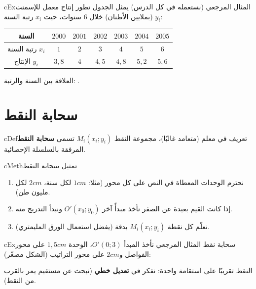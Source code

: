 \documentclass[12pt,a4paper]{article}
\newenvironment{BOX}[2]{\begin{otherlanguage}{english}\begin{arbox}{#1}{#2}}{\end{arbox}\end{otherlanguage}}
\newenvironment{tarif}[1][تعريف]{\begin{BOX}{cDef}{#1}}{\end{BOX}}
\newenvironment{mithal}[1][مثال]{\begin{BOX}{cEx}{#1}}{\end{BOX}}
\newenvironment{tariqa}[1][طريقة]{\begin{BOX}{cMeth}{#1}}{\end{BOX}}
\newenvironment{LTR}{\begin{otherlanguage}{english}}{\end{otherlanguage}}
\newcommand{\ar}[1]{\foreignlanguage{arabic}{#1}}
\newcommand{\bxt}[1]{\foreignlanguage{english}{\bxtbox{\ar{#1}}}}
\newcommand{\Paper}[2]{%
 \fill[orange!4] (0cm,0cm) rectangle (#1,#2);
 \draw[orange!22,very thin,step=1mm] (0cm,0cm) grid (#1,#2);
 \draw[orange!40,thin,step=5mm] (0cm,0cm) grid (#1,#2);
 \draw[orange!65,step=1cm] (0cm,0cm) grid (#1,#2);}
\newcommand{\Pt}[1]{\fill[cThm] #1 circle (2.2pt);}
\newenvironment{FIG}{\par\begin{center}\begin{LTR}}{\end{LTR}\end{center}}
\begin{document}
\begin{mithal}[المثال المرجعي (نستعمله في كل الدرس)]
يمثل الجدول تطور إنتاج معمل للإسمنت $y_i$ (بملايين الأطنان) خلال 6 سنوات، حيث $x_i$ رتبة السنة:
\begin{center}
\begin{tabular}{|C|c|c|c|c|c|c|}\hline
{} السنة & $2000$ & $2001$ & $2002$ & $2003$ & $2004$ & $2005$\\\hline
رتبة السنة $x_i$ & $1$ & $2$ & $3$ & $4$ & $5$ & $6$\\\hline
الإنتاج $y_i$ & $3,8$ & $4$ & $4,5$ & $4,8$ & $5,2$ & $5,6$\\\hline
\end{tabular}
\end{center}
العلاقة بين السنة والرتبة: \bxt{السنة $=1999+x_i$}.
\end{mithal}

\section{سحابة النقط}
\begin{tarif}
في معلم (متعامد غالبًا)، مجموعة النقط $M_i(x_i;y_i)$ تسمى \textbf{سحابة النقط} المرفقة بالسلسلة الإحصائية.
\end{tarif}

\begin{tariqa}[تمثيل سحابة النقط]
\begin{enumerate}[label=\textbf{\arabic*.}]
\item نحترم الوحدات المعطاة في النص على كل محور (مثلا: $1cm$ لكل سنة، $2cm$ لكل مليون طن).
\item إذا كانت القيم بعيدة عن الصفر نأخذ مبدأً آخر $O'(x_0;y_0)$ ونبدأ التدريج منه.
\item نعلّم كل نقطة $M_i(x_i;y_i)$ بدقة (يفضل استعمال الورق المليمتري).
\end{enumerate}
\end{tariqa}

\begin{mithal}[سحابة نقط المثال المرجعي]
نأخذ المبدأ $O'(0;3)$، الوحدة $1,5cm$ على محور الفواصل و$2cm$ على محور التراتيب (الشكل مصغّر):
\begin{FIG}
\end{FIG}
النقط تقريبًا على استقامة واحدة: نفكر في \textbf{تعديل خطي} (نبحث عن مستقيم يمر بالقرب من النقط).
\end{mithal}
\end{document}
